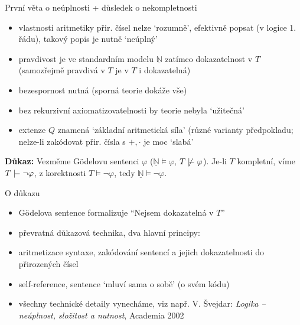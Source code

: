 \documentclass{beamer}
\begin{document}
\begin{frame}{První věta o neúplnosti + důsledek o nekompletnosti}


    \begin{itemize}
        \item vlastnosti aritmetiky přir. čísel nelze `rozumně', efektivně popsat (v logice 1. řádu), takový popis je nutně `neúplný'
        \item \alert{pravdivost} je ve standardním modelu $\underline{\mathbb N}$ zatímco \alert{dokazatelnost} v $T$ (samozřejmě pravdivá v $T$ je v $T$ i dokazatelná)
        \item \alert{bezespornost} nutná (sporná teorie dokáže vše)
        \item bez \alert{rekurzivní axiomatizovatelnosti} by teorie nebyla `užitečná'
        \item extenze $Q$ znamená `základní aritmetická síla' (různé varianty předpokladu; nelze-li zakódovat přir. čísla s $+,\cdot$ je moc `slabá'
    \end{itemize}    

    
    \textbf{Důkaz:}
        Vezměme Gödelovu sentenci $\varphi$ ($\underline{\mathbb N}\models\varphi$, $T\not\proves\varphi$). Je-li $T$ kompletní, víme $T\proves\neg\varphi$, z korektnosti $T\models\neg\varphi$, tedy $\underline{\mathbb N}\models\neg\varphi$.
    \hfill\qedsymbol    

\end{frame}


\begin{frame}{O důkazu}

    \begin{itemize}
        \item Gödelova sentence formalizuje \alert{``Nejsem dokazatelná v $T$''}
        \item převratná důkazová technika, dva hlavní principy:
        \item \alert{aritmetizace syntaxe}, zakódování sentencí a jejich dokazatelnosti do přirozených čísel
        \item \alert{self-reference}, sentence `mluví sama o sobě' (o svém kódu)
        \item všechny technické detaily vynecháme, viz např. V. Švejdar: \emph{Logika -- neúplnost, složitost a nutnost}, Academia 2002
    \end{itemize}
    
\end{frame}
\end{document}
